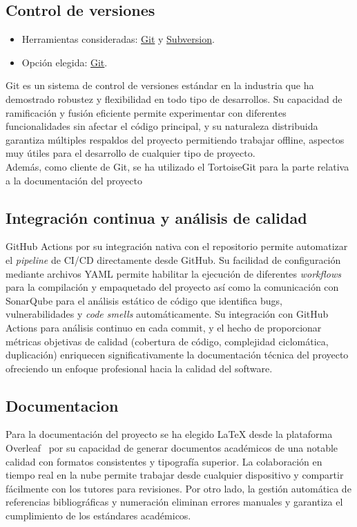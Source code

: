 \subsection{Control de versiones}\label{control-de-versiones}

\begin{itemize}
\tightlist
\item
  Herramientas consideradas: \href{https://git-scm.com/}{Git} y
  \href{https://subversion.apache.org/}{Subversion}.
\item
  Opción elegida: \href{https://git-scm.com/}{Git}.
\end{itemize}

Git es un sistema de control de versiones estándar en la industria que ha demostrado robustez y flexibilidad en todo tipo de desarrollos. Su capacidad de ramificación y fusión eficiente permite experimentar con diferentes funcionalidades sin afectar el código principal, y su naturaleza distribuida garantiza múltiples respaldos del proyecto permitiendo trabajar offline, aspectos muy útiles para el desarrollo de cualquier tipo de proyecto.\\
Además, como cliente de Git, se ha utilizado el TortoiseGit para la parte relativa a la documentación del proyecto

\subsection{Integración continua y análisis de calidad}\label{integracion-continua-analisis-calidad}
GitHub Actions por su integración nativa con el repositorio permite automatizar el \emph{pipeline} de CI/CD directamente desde GitHub. Su facilidad de configuración mediante archivos YAML permite habilitar la ejecución de diferentes \emph{workflows} para la compilación y empaquetado del proyecto así como la comunicación con SonarQube para el análisis estático de código que identifica bugs, vulnerabilidades y \emph{code smells} automáticamente. Su integración con GitHub Actions para análisis continuo en cada commit, y el hecho de proporcionar métricas objetivas de calidad (cobertura de código, complejidad ciclomática, duplicación) enriquecen significativamente la documentación técnica del proyecto ofreciendo un enfoque profesional hacia la calidad del software.

\subsection{Documentacion}\label{documentacion}
Para la documentación del proyecto se ha elegido LaTeX desde la plataforma Overleaf~\cite{overleaf} por su capacidad de generar documentos académicos de una notable calidad con formatos consistentes y tipografía superior. La colaboración en tiempo real en la nube permite trabajar desde cualquier dispositivo y compartir fácilmente con los tutores para revisiones. Por otro lado, la gestión automática de referencias bibliográficas y numeración eliminan errores manuales y garantiza el cumplimiento de los estándares académicos.

